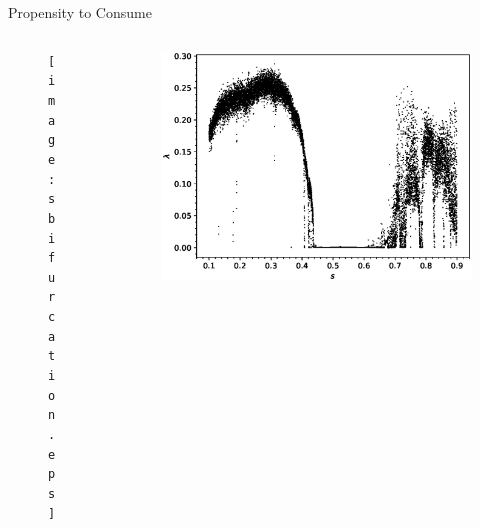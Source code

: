 \documentclass{beamer}
\begin{document}
\begin{frame}{Propensity to Consume}
	\begin{columns}
	\begin{column}{0.5\textwidth}
		\begin{figure}
			\centering
			\texttt{[image: sbifurcation.eps]}
		\end{figure}
	\end{column}
	\begin{column}{0.5\textwidth}
		\begin{figure}
			\centering
			\includegraphics[width=1.2\textwidth]{slyplot.eps}
		\end{figure}
	\end{column}
	\end{columns}
\end{frame}
\end{document}
